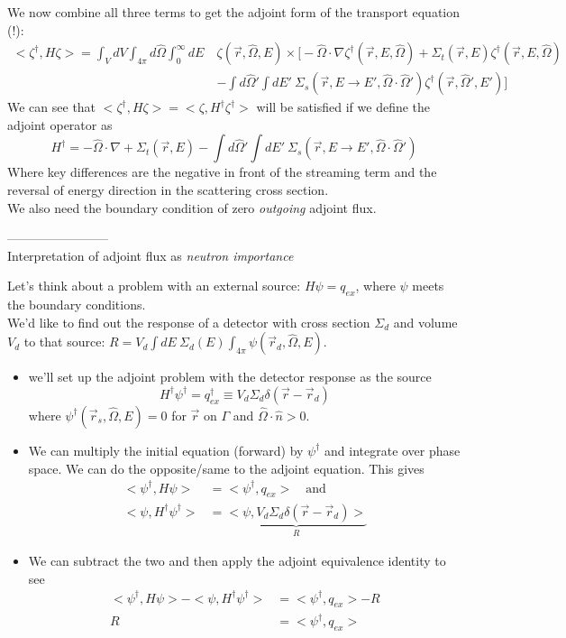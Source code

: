 \documentclass[12pt]{article}
\newcommand{\rvec}{\ensuremath{\vec{r}}}
\newcommand{\vOmega}{\ensuremath{\hat{\Omega}}}
\begin{document}
%
We now combine all three terms to get the adjoint form of the transport equation (!):
\begin{align*}
<\zeta^{\dagger}, H \zeta> = \int_{V} dV \int_{4\pi} d\vOmega \int_0^{\infty} dE \: &\zeta (\rvec, \vOmega, E) \times \biggl[-\vOmega \cdot \nabla \zeta^{\dagger}(\vec{r}, E, \vOmega)  + \Sigma_t(\rvec,E) \zeta^{\dagger}(\vec{r}, E, \vOmega) \\&- \int d\vOmega' \int dE'\: \Sigma_s(\rvec, E \rightarrow E', \vOmega \cdot \vOmega') \zeta^{\dagger}(\rvec, \vOmega', E') \biggr]
\end{align*}
%
We can see that $<\zeta^{\dagger}, H \zeta> = <\zeta, H^{\dagger} \zeta^{\dagger}>$ will be satisfied if we define the adjoint operator as
\[
H^{\dagger} = -\vOmega \cdot \nabla  + \Sigma_t(\rvec,E) - \int d\vOmega' \int dE'\: \Sigma_s(\rvec, E \rightarrow E', \vOmega \cdot \vOmega')
\]
Where key differences are the negative in front of the streaming term and the reversal of energy direction in the scattering cross section.\\
We also need the boundary condition of zero \textit{outgoing} adjoint flux.

------------------------\\
Interpretation of adjoint flux as \textit{neutron importance}

Let's think about a problem with an external source: $H \psi = q_{ex}$, where $\psi$ meets the boundary conditions.\\
We'd like to find out the response of a detector with cross section $\Sigma_d$ and volume $V_d$ to that source: $R = V_d \int dE\: \Sigma_d(E) \int_{4\pi} \psi(\rvec_d, \vOmega, E)$. \\
\begin{itemize}
\item we'll set up the adjoint problem with the detector response as the source
\[H^{\dagger}\psi^{\dagger} = q_{ex}^{\dagger} \equiv V_d \Sigma_d \delta(\rvec - \rvec_d)\]
where $\psi^{\dagger}(\vec{r}_s, \vOmega, E) = 0$ for $\rvec$ on $\Gamma$ and $\vOmega \cdot \hat{n} > 0$.
%
\item We can multiply the initial equation (forward) by $\psi^{\dagger}$ and integrate over phase space. We can do the opposite/same to the adjoint equation. This gives
\begin{align*}
<\psi^{\dagger}, H\psi> &= <\psi^{\dagger}, q_{ex}> \quad \text{and}\\
<\psi, H^{\dagger} \psi^{\dagger}> &= \underbrace{<\psi, V_d \Sigma_d \delta(\rvec - \rvec_d)> }_R
\end{align*}
%
\item We can subtract the two and then apply the adjoint equivalence identity to see
\begin{align*}
<\psi^{\dagger}, H\psi> - <\psi, H^{\dagger} \psi^{\dagger}> &= <\psi^{\dagger}, q_{ex}> - R \\
R &= <\psi^{\dagger}, q_{ex}>
\end{align*}
\end{itemize}
\end{document}
